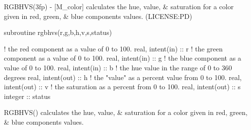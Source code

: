 \begin{DoxyDescription}
\item[\label{_RGBHVS}%
N\+A\+ME ]R\+G\+B\+H\+V\+S(3fp) -\/ \mbox{[}M\+\_\+color\mbox{]} calculates the hue, value, \& saturation for a color given in red, green, \& blue components values. (L\+I\+C\+E\+N\+SE\+:PD) 


\item[S\+Y\+N\+O\+P\+S\+IS ]
\begin{DoxyPre}
    subroutine rgbhvs(r,g,b,h,v,s,status)\end{DoxyPre}



\begin{DoxyPre}     ! the red component as a value of 0 to 100.
     real, intent(in)  :: r
     ! the green component as a value of 0 to 100.
     real, intent(in)  :: g
     ! the blue component as a value of 0 to 100.
     real, intent(in)  :: b
     ! the hue value in the range of 0 to 360 degrees
     real, intent(out) :: h
     ! the "value" as a percent value from 0 to 100.
     real, intent(out) :: v
     ! the saturation as a percent from 0 to 100.
     real, intent(out) :: s
     integer           :: status
    
\begin{DoxyPre}
 \end{DoxyPre}
\end{DoxyPre}



\begin{DoxyPre}
\begin{DoxyPre} \end{DoxyPre}
\end{DoxyPre}

\item[D\+E\+S\+C\+R\+I\+P\+T\+I\+ON ]
\begin{DoxyPre}
\begin{DoxyPre}\end{DoxyPre}
\end{DoxyPre}



\begin{DoxyPre}
\begin{DoxyPre} RGBHVS() calculates the hue, value, \& saturation
 for a color given in red, green, \& blue components values.
 ~\newline
~\newline
\end{DoxyPre}
\end{DoxyPre}




\end{DoxyDescription}

